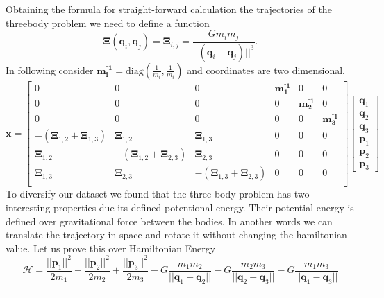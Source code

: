 Obtaining the formula for straight-forward calculation the trajectories of the threebody problem we need to define a function
\begin{equation}
	\boldsymbol{\Xi}(\mathbf{q}_i,\mathbf{q}_j)=\boldsymbol{\Xi}_{i,j}=\frac{Gm_im_j}{||(\mathbf{q}_i-\mathbf{q}_j)||^3}.
\end{equation}
In following consider $\mathbf{m_i^{⁻1}}=\text{diag}(\frac{1}{m_i},\frac{1}{m_i})$ and coordinates are two dimensional.
\begin{equation}
	\dot{\mathbf{x}} = 
	\begin{bmatrix}
		0 & 0 & 0 & \mathbf{m_1^{⁻1}} & 0 & 0\\
		0 & 0 & 0 & 0 & \mathbf{m_2^{⁻1}} & 0\\
		0 & 0 & 0 & 0 & 0 & \mathbf{m_3^{⁻1}}\\
		-(\boldsymbol{\Xi}_{1,2}+\boldsymbol{\Xi}_{1,3}) & \boldsymbol{\Xi}_{1,2} & \boldsymbol{\Xi}_{1,3} & 0 & 0 & 0\\
		\boldsymbol{\Xi}_{1,2} & -(\boldsymbol{\Xi}_{1,2}+\boldsymbol{\Xi}_{2,3}) & \boldsymbol{\Xi}_{2,3} & 0 & 0 & 0\\
		\boldsymbol{\Xi}_{1,3} & \boldsymbol{\Xi}_{2,3} & -(\boldsymbol{\Xi}_{1,3}+\boldsymbol{\Xi}_{2,3}) & 0 & 0 & 0\\
	\end{bmatrix}
	\begin{bmatrix}
		\mathbf{q}_1\\
		\mathbf{q}_2\\
		\mathbf{q}_3\\
		\mathbf{p}_1\\
		\mathbf{p}_2\\
		\mathbf{p}_3
	\end{bmatrix}
\end{equation}
To diversify our dataset we found that
the three-body problem has two interesting properties due its defined potentional energy. Their potential energy is defined over gravitational force between the bodies. In another words we can translate the trajectory in space and rotate it without changing the hamiltonian value. Let us prove this over Hamiltonian Energy
\begin{equation}
	\mathcal{H} = \frac{||\mathbf{p}_1||^2}{2m_1} +\frac{||\mathbf{p}_2||^2}{2m_2}+\frac{||\mathbf{p}_3||^2}{2m_3} - G\frac{m_1m_2}{||\mathbf{q}_1 - \mathbf{q}_2||}-G\frac{m_2m_3}{||\mathbf{q}_2 - \mathbf{q}_3||}-G\frac{m_1m_3}{||\mathbf{q}_1 - \mathbf{q}_3||} 
\end{equation}-
